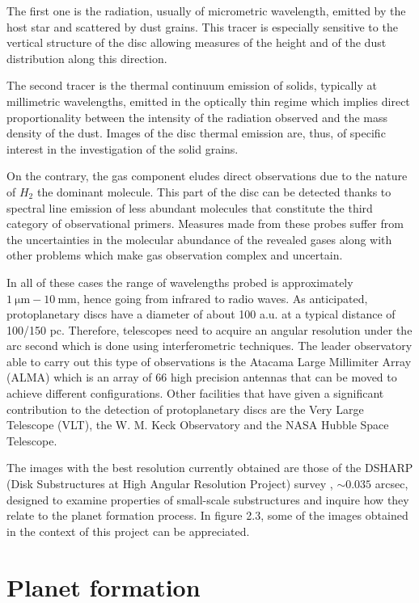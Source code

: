 \documentclass[a4paper,10pt]{report}
\begin{document}
The first one is the radiation, usually of micrometric wavelength, emitted by the host star and scattered by dust grains.
This tracer is especially sensitive to the vertical structure 
of the disc allowing measures of the height and of the dust distribution along this direction.

The second tracer is the thermal continuum emission of solids, typically at millimetric wavelengths,
emitted in the optically thin regime which implies direct proportionality between the intensity of the radiation observed and the
mass density of the dust. Images of the disc thermal emission are, thus, of specific interest in the investigation of the solid grains.

On the contrary, the gas component eludes direct observations due to the nature of $H_2$ the dominant molecule.
This part of the disc can be detected thanks to spectral line emission of less abundant molecules 
that constitute the third category of observational primers. Measures made from these probes suffer from
the uncertainties in the molecular abundance of the revealed gases along with other problems
which make gas observation complex and uncertain.

In all of these cases the range of wavelengths probed is approximately $\SI{1}{\micro\m} - \SI{10}{\mm}$, hence going from infrared to radio waves.
As anticipated, protoplanetary discs have a diameter of about 100 a.u. at a typical distance of 100/150 pc. Therefore, telescopes need to acquire an angular
resolution under the arc second which is done using interferometric techniques. The leader observatory able to carry out this type of observations is the Atacama Large Millimiter Array (ALMA)
which is an array of 66 high precision antennas that can be moved to achieve different configurations. 
Other facilities that have given a significant contribution to the detection of protoplanetary discs are the Very Large Telescope (VLT), the W. M. Keck Observatory and the NASA
Hubble Space Telescope.

The images with the best resolution currently obtained are those of the DSHARP (Disk Substructures at High Angular Resolution Project) survey \cite{dsharp}, $\sim 0.035$ arcsec, designed to examine properties
of small-scale substructures and inquire how they relate to the planet formation process. In figure 2.3, some of the images obtained in the context of this project
can be appreciated.


\section{Planet formation}
\end{document}
